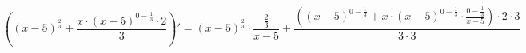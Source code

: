 \documentclass[12pt]{article}
\begin{document}
\[ \left(  \left( x-5 \right) ^ { \frac{2}{3} } + \frac{x \cdot  \left( x-5 \right) ^ {0- \frac{1}{3} }  \cdot 2}{3} \right) ' =  \left( x-5 \right) ^ { \frac{2}{3} }  \cdot  \frac{ \frac{2}{3} }{x-5} + \frac{ \left(  \left( x-5 \right) ^ {0- \frac{1}{3} } +x \cdot  \left( x-5 \right) ^ {0- \frac{1}{3} }  \cdot  \frac{0- \frac{1}{3} }{x-5}  \right)  \cdot 2 \cdot 3}{3 \cdot 3}  \]
\end{document}
